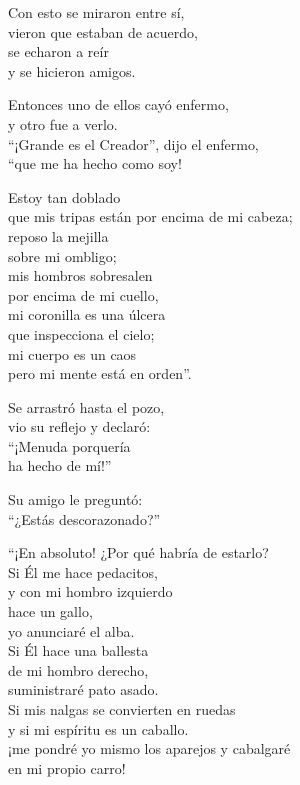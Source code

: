 \documentclass[book,b5paper,hidelinks,final]{memoir}
\begin{document}
	Con esto se miraron entre sí,\\
	vieron que estaban de acuerdo,\\
	se echaron a reír\\
	y se hicieron amigos.
	
	Entonces uno de ellos cayó enfermo,\\
	y otro fue a verlo.\\
	``¡Grande es el Creador'', dijo el enfermo,\\
	``que me ha hecho como soy!
	
	Estoy tan doblado\\
	que mis tripas están por encima de mi cabeza;\\
	reposo la mejilla\\
	sobre mi ombligo;\\
	mis hombros sobresalen\\
	por encima de mi cuello,\\
	mi coronilla es una úlcera\\
	que inspecciona el cielo;\\
	mi cuerpo es un caos\\
	pero mi mente está en orden''.
	
	Se arrastró hasta el pozo,\\
	vio su reflejo y declaró:\\
	``¡Menuda porquería\\
	ha hecho de mí!''
	
	Su amigo le preguntó:\\
	``¿Estás descorazonado?''
	
	``¡En absoluto! ¿Por qué habría de estarlo?\\
	Si Él me hace pedacitos,\\
	y con mi hombro izquierdo\\
	hace un gallo,\\
	yo anunciaré el alba.\\
	Si Él hace una ballesta\\
	de mi hombro derecho,\\
	suministraré pato asado.\\
	Si mis nalgas se convierten en ruedas\\
	y si mi espíritu es un caballo.\\
	¡me pondré yo mismo los aparejos y cabalgaré\\
	en mi propio carro!
	
\end{document}

